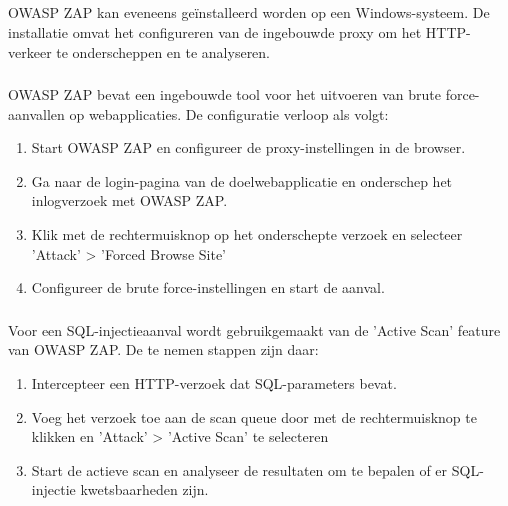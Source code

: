 \subsection{}
OWASP ZAP kan eveneens geïnstalleerd worden op een Windows-systeem. De installatie omvat het configureren van de ingebouwde 
proxy om het HTTP-verkeer te onderscheppen en te analyseren.
\subsubsection{}
OWASP ZAP bevat een ingebouwde tool voor het uitvoeren van brute force-aanvallen op webapplicaties.
De configuratie verloop als volgt:
\begin{enumerate}
    \item Start OWASP ZAP en configureer de proxy-instellingen in de browser.
    \item Ga naar de login-pagina van de doelwebapplicatie en onderschep het inlogverzoek met OWASP ZAP.
    \item Klik met de rechtermuisknop op het onderschepte verzoek en selecteer 'Attack' > 'Forced Browse Site'
    \item Configureer de brute force-instellingen en start de aanval.
\end{enumerate}

\subsubsection{}
Voor een SQL-injectieaanval wordt gebruikgemaakt van de 'Active Scan' feature van OWASP ZAP.
De te nemen stappen zijn daar:
\begin{enumerate}
    \item Intercepteer een HTTP-verzoek dat SQL-parameters bevat.
    \item Voeg het verzoek toe aan de scan queue door met de rechtermuisknop te klikken en 'Attack' > 'Active Scan' te selecteren
    \item Start de actieve scan en analyseer de resultaten om te bepalen of er SQL-injectie kwetsbaarheden zijn.
\end{enumerate}